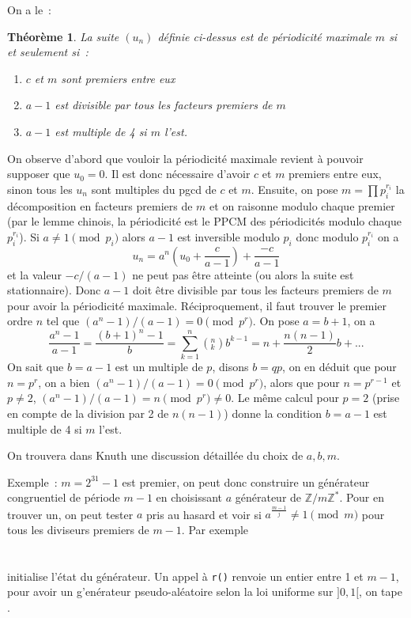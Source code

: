 \documentclass[a4paper,11pt]{article}
\newtheorem{thm}{Théorème}
\begin{document}
\begin{giacjshere}
On a le~:
\begin{thm}
La suite $(u_n)$ définie ci-dessus est de périodicité maximale $m$ si
et seulement si~:
\begin{enumerate}
\item $c$ et $m$ sont premiers entre eux
\item $a-1$ est divisible par tous les facteurs premiers de $m$
\item $a-1$ est multiple de 4 si $m$ l'est.
\end{enumerate}
\end{thm}
On observe d'abord que vouloir la périodicité maximale revient
à pouvoir supposer que $u_0=0$. 
Il est donc nécessaire d'avoir $c$
et $m$ premiers entre eux, sinon tous les $u_n$ sont multiples du
pgcd de $c$ et $m$. Ensuite, on pose $m=\prod p_i^{r_i}$ la
décomposition en facteurs premiers de $m$ et on raisonne modulo
chaque premier (par le lemme chinois, la p\'eriodicit\'e
est le PPCM des p\'eriodicit\'es modulo chaque $p_i^{r_i}$). 
Si $a\neq 1 \pmod p_i$
alors $a-1$ est inversible modulo $p_i$ donc modulo 
$p_i^{r_i}$ on a
$$ u_n=a^n (u_0 + \frac{c}{a-1}) + \frac{-c}{a-1}  $$
et la valeur $-c/(a-1)$ ne peut pas \^etre atteinte
(ou alors la suite est stationnaire).
Donc $a-1$ doit \^etre divisible par tous les facteurs premiers de $m$
pour avoir la p\'eriodicit\'e maximale.
R\'eciproquement, il faut trouver le premier ordre $n$ tel que
$(a^n-1)/(a-1)=0 \pmod{p^r}$. On pose $a=b+1$, on a
$$ \frac{a^n-1}{a-1}=\frac{(b+1)^n-1}{b} = \sum_{k=1}^n
\left(^n_k\right) b^{k-1} = n +\frac{n(n-1)}{2}b +... $$
On sait que $b=a-1$ est un multiple de $p$, disons $b=qp$, on en d\'eduit que
pour $n=p^r$, on a bien $(a^n-1)/(a-1)=0 \pmod{p^r}$, alors que
pour $n=p^{r-1}$ et $p\neq 2$, $(a^n-1)/(a-1)=n \pmod{p^r} \neq 0$.
Le m\^eme calcul pour $p=2$ (prise en compte de la division par 2 de
$n(n-1)$) donne la condition $b=a-1$ est multiple de 4 si $m$ l'est.

On trouvera dans Knuth une discussion détaillée du choix de $a, b, m$.


Exemple~: $m=2^{31}-1$ est premier, on peut donc construire un
g\'en\'erateur congruentiel de p\'eriode $m-1$ en choisissant $a$
g\'en\'erateur de $\mathbb{Z}/m\mathbb{Z}^*$. Pour en trouver un, on peut tester
$a$ pris au hasard et voir si $a^{\frac{m-1}{j}} \neq 1 \pmod m$
pour tous les diviseurs premiers de $m-1$. Par exemple\\
\\
\\
 initialise l'\'etat du g\'en\'erateur.
Un appel \`a \verb|r()| renvoie un entier entre 1 et $m-1$, pour avoir
un g'en\'erateur pseudo-al\'eatoire selon la loi uniforme sur $]0,1[$, on tape
.


\end{giacjshere}
\end{document}
